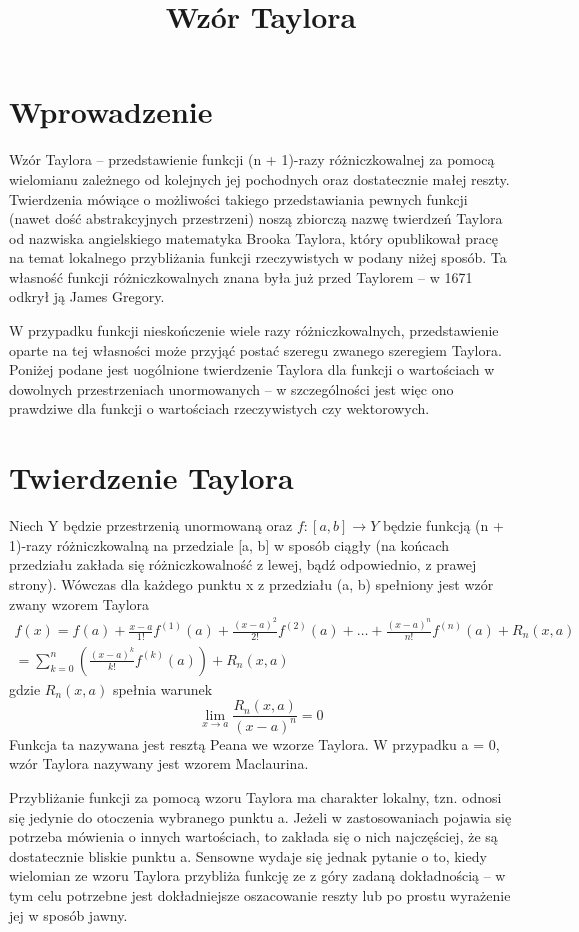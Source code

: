 \documentclass{article}
\begin{document}
\title{Wzór Taylora}
\maketitle

\section*{Wprowadzenie}
Wzór Taylora – przedstawienie funkcji (n + 1)-razy różniczkowalnej za pomocą wielomianu zależnego od kolejnych jej pochodnych oraz dostatecznie małej reszty. Twierdzenia mówiące o możliwości takiego przedstawiania pewnych funkcji (nawet dość abstrakcyjnych przestrzeni) noszą zbiorczą nazwę twierdzeń Taylora od nazwiska angielskiego matematyka Brooka Taylora, który opublikował pracę na temat lokalnego przybliżania funkcji rzeczywistych w podany niżej sposób. Ta własność funkcji różniczkowalnych znana była już przed Taylorem – w 1671 odkrył ją James Gregory.

W przypadku funkcji nieskończenie wiele razy różniczkowalnych, przedstawienie oparte na tej własności może przyjąć postać szeregu zwanego szeregiem Taylora. Poniżej podane jest uogólnione twierdzenie Taylora dla funkcji o wartościach w dowolnych przestrzeniach unormowanych – w szczególności jest więc ono prawdziwe dla funkcji o wartościach rzeczywistych czy wektorowych. 

\section*{Twierdzenie Taylora}
Niech Y będzie przestrzenią unormowaną oraz $ f\colon [a,b]\to Y $ będzie funkcją (n + 1)-razy różniczkowalną na przedziale [a, b] w sposób ciągły (na końcach przedziału zakłada się różniczkowalność z lewej, bądź odpowiednio, z prawej strony). Wówczas dla każdego punktu x z przedziału (a, b) spełniony jest wzór zwany wzorem Taylora 
\begin{multline*} 
f(x)=f(a)+{\frac {x-a}{1!}}f^{(1)}(a)+{\frac {(x-a)^{2}}{2!}}f^{(2)}(a)+\ldots +{\frac {(x-a)^{n}}{n!}}f^{(n)}(a)+R_{n}(x,a)\\=\sum \limits _{k=0}^{n}\left({\frac {(x-a)^{k}}{k!}}f^{(k)}(a)\right)+R_{n}(x,a)
\end{multline*}
gdzie $ R_{n}(x,a) $ spełnia warunek
$$ \lim _{{x\to a}}{\frac  {R_{n}(x,a)}{(x-a)^{n}}}=0 $$
Funkcja ta nazywana jest resztą Peana we wzorze Taylora. W przypadku a = 0, wzór Taylora nazywany jest wzorem Maclaurina. 

Przybliżanie funkcji za pomocą wzoru Taylora ma charakter lokalny, tzn. odnosi się jedynie do otoczenia wybranego punktu a. Jeżeli w zastosowaniach pojawia się potrzeba mówienia o innych wartościach, to zakłada się o nich najczęściej, że są dostatecznie bliskie punktu a. Sensowne wydaje się jednak pytanie o to, kiedy wielomian ze wzoru Taylora przybliża funkcję ze z góry zadaną dokładnością – w tym celu potrzebne jest dokładniejsze oszacowanie reszty lub po prostu wyrażenie jej w sposób jawny. 
\end{document}
